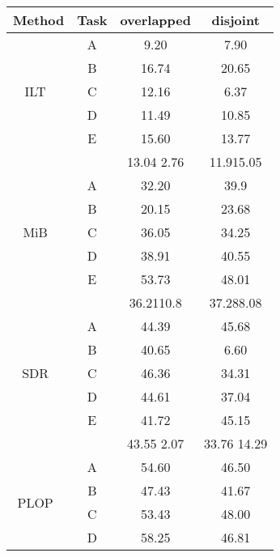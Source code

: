 \documentclass[10pt,twocolumn,letterpaper]{article}
\begin{document}
\begin{table}[!htp]
\begin{tabular}{c|c|c|c}
\hline
Method                & Task & overlapped & disjoint \\ \toprule
\multirow{5}{*}{ILT~\cite{ilt}}  & A    & 9.20       & 7.90     \\
                      & B    & 16.74      & 20.65    \\
                      & C    & 12.16      & 6.37     \\
                      & D    & 11.49      & 10.85    \\
                      & E    & 15.60      & 13.77    \\
                      &   & \cellcolor{blue!80!gray!20!} 13.04  2.76  & \cellcolor{blue!80!gray!20!} 11.915.05 \\ \hline \hline
\multirow{5}{*}{MiB~\cite{mib}}  & A    & 32.20      & 39.9     \\
                      & B    & 20.15      & 23.68    \\
                      & C    & 36.05      & 34.25    \\
                      & D    & 38.91      & 40.55    \\
                      & E    & 53.73      & 48.01    \\ 
                      &   & \cellcolor{blue!80!gray!20!} 36.2110.8  & \cellcolor{blue!80!gray!20!}  37.288.08       \\\hline \hline
\multirow{5}{*}{SDR~\cite{sdr}}  & A    & 44.39      & 45.68    \\
                      & B    & 40.65      & 6.60     \\
                      & C    & 46.36      & 34.31    \\
                      & D    & 44.61      & 37.04    \\
                      & E    & 41.72      & 45.15    \\ 
                      &   & \cellcolor{blue!80!gray!20!} 43.55  2.07  & \cellcolor{blue!80!gray!20!} 33.76  14.29 \\    \hline \hline
\multirow{5}{*}{PLOP~\cite{plop}} & A    & 54.60      & 46.50    \\
                      & B    & 47.43      & 41.67    \\
                      & C    & 53.43      & 48.00    \\
                      & D    & 58.25      & 46.81    \\

\end{tabular}
\end{table}
\end{document}
